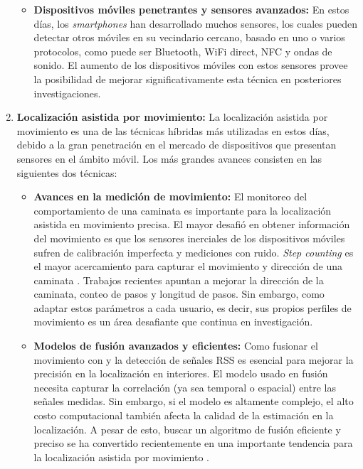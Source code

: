 \begin{enumerate}
\begin{itemize}
\item \textbf{Dispositivos móviles penetrantes y sensores avanzados:} En estos días, los \textit{smartphones} han desarrollado muchos sensores, los cuales pueden detectar otros móviles en su vecindario cercano, basado en uno o varios protocolos, como puede ser Bluetooth, WiFi direct, NFC y ondas de sonido. El aumento de los dispositivos móviles con estos sensores provee la posibilidad de mejorar significativamente esta técnica en posteriores investigaciones.
\end{itemize}


\item \textbf{Localización asistida por movimiento: } La localización asistida por movimiento es una de las técnicas híbridas más utilizadas en estos días, debido a la gran penetración en el mercado de dispositivos que presentan sensores en el ámbito móvil. Los más grandes avances consisten en las siguientes dos técnicas:

\begin{itemize}
\item \textbf{Avances en la medición de movimiento:} El monitoreo del comportamiento de una caminata es importante para la localización asistida en movimiento precisa. El mayor desafió en obtener información del movimiento es que los sensores inerciales de los dispositivos móviles sufren de calibración imperfecta y mediciones con ruido. \textit{Step counting} es el mayor acercamiento para capturar el movimiento y dirección de una caminata \citep{6407455}. Trabajos recientes apuntan a mejorar la dirección de la caminata, conteo de pasos y longitud de pasos. Sin embargo, como adaptar estos parámetros a cada usuario, es decir, sus propios perfiles de movimiento es un área desafiante que continua en investigación.

\item \textbf{Modelos de fusión avanzados y eficientes:} Como fusionar el movimiento con y la detección de señales RSS es esencial para mejorar la precisión en la localización en interiores. El modelo usado en fusión necesita capturar la correlación (ya sea temporal o espacial) entre las señales medidas. Sin embargo, si el modelo es altamente complejo, el alto costo computacional también afecta la calidad de la estimación en la localización. A pesar de esto, buscar un algoritmo de fusión eficiente y preciso se ha convertido recientemente en una importante tendencia para la localización asistida por movimiento \citep{6846747}.

\end{itemize}
\end{enumerate}
